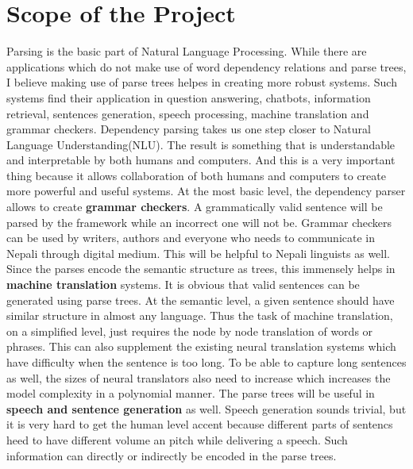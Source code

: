 \chapter{Scope of the Project}
Parsing is the basic part of Natural Language Processing. While there are
applications which do not make use of word dependency relations and parse
trees, I believe making use of parse trees helpes in creating more robust
systems. Such systems find their application in question answering, chatbots,
information retrieval, sentences generation, speech processing, machine
translation and grammar checkers. Dependency parsing takes us one step closer
to Natural Language Understanding(NLU). The result is something that is
understandable and interpretable by both humans and computers. And this is a
very important thing because it allows collaboration of both humans and
computers to create more powerful and useful systems.
\newline
\newline
At the most basic level, the dependency parser allows to create \textbf{grammar
checkers}. A grammatically valid sentence will be parsed by the framework while
an incorrect one will not be. Grammar checkers can be used by writers, authors
and everyone who needs to communicate in Nepali through digital medium. This
will be helpful to Nepali linguists as well.
\newline
\newline
Since the parses encode the semantic structure as trees, this immensely helps
in \textbf{machine translation} systems. It is obvious that valid sentences can
be generated using parse trees. At the semantic level, a given sentence should
have similar structure in almost any language. Thus the task of machine
translation, on a simplified level, just requires the node by node translation of
words or phrases. This can also supplement the existing neural translation
systems which have difficulty when the sentence is too long. To be able to
capture long sentences as well, the sizes of neural translators also need to
increase which increases the model complexity in a polynomial manner.
\newline
\newline
The parse trees will be useful in \textbf{speech and sentence generation} as
well. Speech generation sounds trivial, but it is very hard to get the human
level accent because different parts of sentencs heed to have different volume
an pitch while delivering a speech. Such information can directly or
indirectly be encoded in the parse trees.

